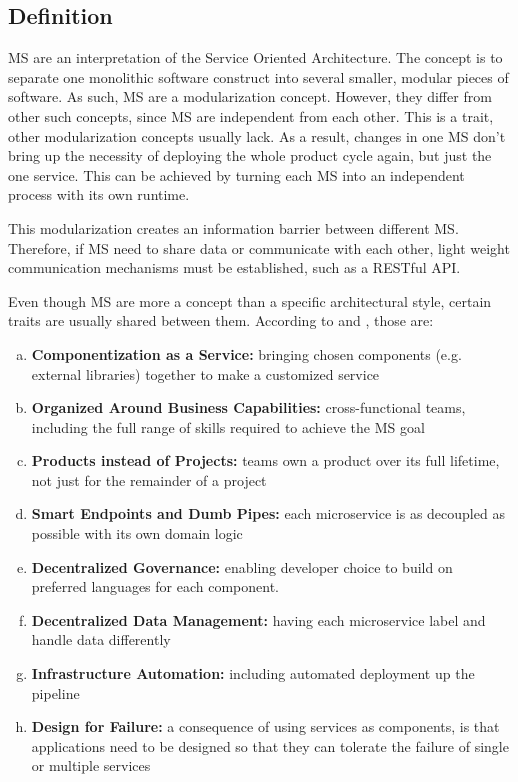 \subsection{Definition}
MS are an interpretation of the Service Oriented Architecture. The concept is to separate one monolithic software construct into several smaller, modular pieces of software\cite{Wolff16}. As such, MS are a modularization concept. However, they differ from other such concepts, since MS are independent from each other. This is a trait, other modularization concepts usually lack\cite{Wolff16}. As a result, changes in one MS don't bring up the necessity of deploying the whole product cycle again, but just the one service. This can be achieved by turning each MS into an independent process with its own runtime\cite{Lewis14}.

This modularization creates an information barrier between different MS. Therefore, if MS need to share data or communicate with each other, light weight communication mechanisms must be established, such as a RESTful API\cite{Riggins15}.

Even though MS are more a concept than a specific architectural style, certain traits are usually shared between them\cite{Riggins15}. According to \cite{Riggins15} and \cite{Lewis14}, those are:

\begin{enumerate}[(a)]
	\item \textbf{Componentization as a Service:} bringing chosen components (e.g. external libraries) together to make a customized service
	\item \textbf{Organized Around Business Capabilities:} cross-functional teams, including the full range of skills required to achieve the MS goal
	\item \textbf{Products instead of Projects:} teams own a product over its full lifetime, not just for the remainder of a project
	\item \textbf{Smart Endpoints and Dumb Pipes:} each microservice is as decoupled as possible with its own domain logic
	\item \textbf{Decentralized Governance:} enabling developer choice to build on preferred languages for each component.
	\item \textbf{Decentralized Data Management:} having each microservice label and handle data differently
	\item \textbf{Infrastructure Automation:} including automated deployment up the pipeline
	\item \textbf{Design for Failure:} a consequence of using services as components, is that applications need to be designed so that they can tolerate the failure of single or multiple services
\end{enumerate}

